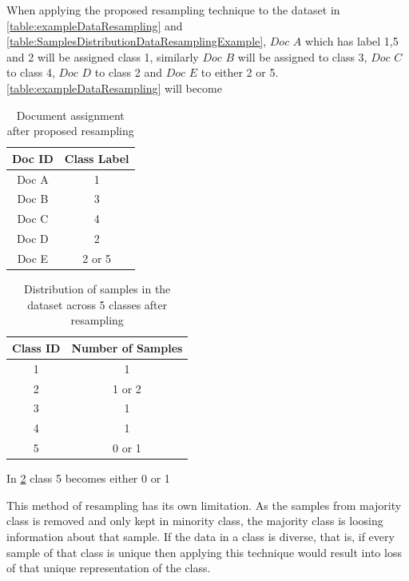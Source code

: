 When applying the proposed resampling technique to the dataset in \ref{table:exampleDataResampling} and  \ref{table:SamplesDistributionDataResamplingExample}, $Doc$ $A$ which has label 1,5 and 2 will be assigned class 1, similarly $Doc$ $B$ will be assigned to class 3, $Doc$ $C$  to class 4, $Doc$ $D$ to class 2 and $Doc$ $E$ to either 2 or 5. \ref{table:exampleDataResampling} will become

\begin{table}[!ht]
\centering
\begin{tabular}{cc}

\hline
\textbf{Doc ID} & \textbf{Class Label} \\ \hline
Doc A           & 1                \\ 
Doc B           & 3                    \\ 
Doc C           & 4                  \\ 
Doc D           & 2                   \\ 
Doc E           & 2 or 5                  \\ \hline
\end{tabular}
\captionsetup{justification=centering,margin=2cm}
\caption{Document assignment after proposed resampling}
\label{table:exampleDataResamplingAfterResampling}
\end{table}
\clearpage
\begin{table}[!ht]
\centering
\begin{tabular}{cc}
\hline
\textbf{Class ID} & \textbf{Number of Samples} \\ \hline
1                 & 1                        \\ 
2                 & 1 or 2                          \\ 
3                 & 1                          \\ 
4                 & 1                          \\ 
5                 & 0 or 1                         \\ \hline
\end{tabular}
\captionsetup{justification=centering,margin=2cm}
\caption{Distribution of samples in the dataset across 5 classes after resampling}
\label{table:SamplesDistributionDataResamplingExampleAfterResampling}
\end{table}

In \ref{table:SamplesDistributionDataResamplingExampleAfterResampling} class 5 becomes either 0 or 1

This method of resampling has its own limitation. As the samples from majority class is removed and only kept in minority class, the majority class is loosing information about that sample. If the data in a class is diverse, that is, if every sample of that class is unique then applying this technique would result into loss of that unique representation of the class.

